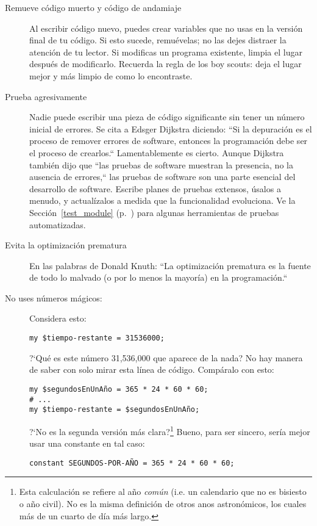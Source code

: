 \begin{description}
\item[Remueve código muerto y código de andamiaje]
Al escribir código nuevo, puedes crear variables que no 
usas en la versión final de tu código. Si esto sucede, 
remuévelas; no las dejes distraer la atención de tu lector. 
Si modificas un programa existente, limpia el lugar después
de modificarlo. Recuerda la regla de los boy scouts: 
deja el lugar mejor y más limpio de como lo encontraste.

\item[Prueba agresivamente] Nadie puede escribir una pieza de
código significante sin tener un número inicial de errores.
Se cita a Edsger Dijkstra diciendo: ``Si la depuración 
es el proceso de remover errores de software, entonces
la programación debe ser el proceso de crearlos.``
Lamentablemente es cierto. Aunque Dijkstra también dijo
que ``las pruebas de software muestran la presencia, no la ausencia de
errores,`` las pruebas de software son una parte esencial del
desarrollo de software. Escribe planes de pruebas extensos, úsalos
a menudo, y actualízalos a medida que la funcionalidad evoluciona.
Ve la Sección~\ref{test_module} (p.~\pageref{test_module}) para algunas herramientas 
de pruebas automatizadas.

\item[Evita la optimización prematura] En las palabras de
Donald Knuth: ``La optimización prematura es la fuente de todo lo 
malvado (o por lo menos la mayoría) en la programación.``

\item[No uses números mágicos:] Considera esto:
\begin{verbatim}
my $tiempo-restante = 31536000;
\end{verbatim}

?`Qué es este número 31,536,000 que aparece de la nada?
No hay manera de saber con solo mirar esta línea de código.
Compáralo con esto:

\begin{verbatim}
my $segundosEnUnAño = 365 * 24 * 60 * 60;
# ...
my $tiempo-restante = $segundosEnUnAño;
\end{verbatim}

?`No es la segunda versión más clara?\footnote{Esta calculación se refiere al año \emph{común} (i.e. un calendario que no es bisiesto o año civil). No es la misma definición de otros
anos astronómicos, los cuales más de un cuarto de día más largo.} Bueno, para
ser sincero, sería mejor usar una constante en tal caso:
\begin{verbatim}
constant SEGUNDOS-POR-AÑO = 365 * 24 * 60 * 60;
\end{verbatim}


\end{description}

